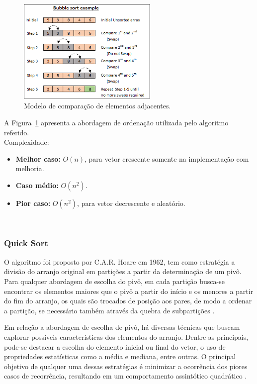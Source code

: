 \documentclass[conference,onecolumn]{IEEEtran}
\begin{document}
\begin{figure}[H]

  \centering
    \includegraphics[width=0.6\textwidth]{images/bubble.png}
    \caption{Modelo de comparação de elementos adjacentes.}        		   \label{image:modelo}
\end{figure}

A Figura~\ref{image:modelo} apresenta a abordagem de ordenação utilizada pelo algoritmo referido.\\

Complexidade:
\begin{itemize}
\item \textbf{Melhor caso:} $O (n)$, para vetor crescente somente na implementação com melhoria.
\item \textbf{Caso médio:} $O (n^2)$.
\item \textbf{Pior caso:} $O (n^2)$, para vetor decrescente e aleatório.
\end{itemize}

~\\
\subsubsection{Quick Sort}

O algoritmo foi proposto por C.A.R. Hoare em 1962, tem como estratégia a divisão do arranjo original em partições a partir da determinação de um pivô. Para qualquer abordagem de escolha do pivô, em cada partição busca-se encontrar os elementos maiores que o pivô a partir do início e os menores a partir do fim do arranjo, os quais são trocados de posição aos pares, de modo a ordenar a partição, se necessário também através da quebra de subpartições \cite{ziviani}.

Em relação a abordagem de escolha de pivô, há diversas técnicas que buscam explorar possíveis características dos elementos do arranjo. Dentre as principais, pode-se destacar a escolha do elemento inicial ou final do vetor, o uso de propriedades estatísticas como a média e mediana, entre outras. O principal objetivo de qualquer uma dessas estratégias é minimizar a ocorrência dos piores casos de recorrência, resultando em um comportamento assintótico quadrático \cite{ziviani}.
\end{document}

